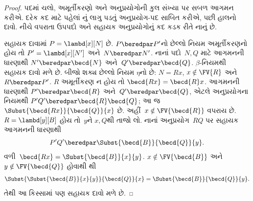 \documentclass[../../../include/open-logic-section]{subfiles}
\begin{document}
\begin{proof}
  પદમાં ચલો, અમૂર્તીકરણો અને અનુપ્રયોગોની કુલ સંખ્યા પર
  સબળ આગમન કરીએ. દરેક કદ માટે પહેલાં
  નું લાગુ પડતું અનુપ્રયોગ-પદ સાબિત
  કરીએ, પછી હાલનો દાવો. નીચે વપરાતા ઉપપદો અને
  સહાયક અનુપ્રયોગોનું કદ કડક રીતે નાનું છે.

  સહાયક દાવામાં $P=\lambd[x][N]$ છે.
  $P\beredpar P'$નો છેલ્લો નિયમ અમૂર્તીકરણનો હોય તો
  $P'=\lambd[x][N']$ અને~$N\beredpar N'$.
  નાનાં પદો~$N,Q$ માટે આગમનની ધારણાથી
  $N'\beredpar\becd{N}$ અને~$Q'\beredpar\becd{Q}$.
  $\beta$-નિયમથી સહાયક દાવો મળે છે.
  બીજો શક્ય છેલ્લો નિયમ $\eta$નો છે:
  $N=Rx$, $x\notin\FV{R}$ અને~$R\beredpar P'$.
  $R$ અમૂર્તીકરણ ન હોય તો
  $\becd{Rx}=\becd{R}x$. આગમનની ધારણાથી
  $P'\beredpar\becd{R}$ અને~$Q'\beredpar\becd{Q}$,
  એટલે અનુપ્રયોગના નિયમથી
  $P'Q'\beredpar\becd{R}\becd{Q}$;
  આ જ~$\Subst{\becd{Rx}}{\becd{Q}}{x}$ છે.
  અહીં~$x\notin\FV{\becd{R}}$ વપરાય છે.
  $R=\lambd[y][B]$ હોય તો~$y$ને $x,Q$થી તાજો લો.
  નાનાં અનુપ્રયોગ~$RQ$ પર સહાયક આગમનની ધારણાથી
  \[
  P'Q'\beredpar\Subst{\becd{B}}{\becd{Q}}{y}.
  \]
  વળી~$\becd{Rx}=\Subst{\becd{B}}{x}{y}$.
  $x\notin\FV{\becd{B}}$ અને~$y\notin\FV{\becd{Q}}$
  હોવાથી થી
  \[
  \Subst{\Subst{\becd{B}}{x}{y}}{\becd{Q}}{x}
  =\Subst{\becd{B}}{\becd{Q}}{y}.
  \]
  તેથી આ કિસ્સામાં પણ સહાયક દાવો મળે છે.


\end{proof}
\end{document}
